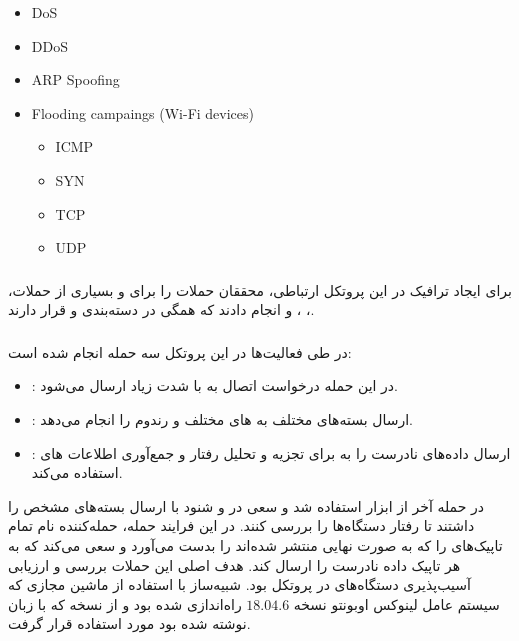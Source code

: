 \begin{LTR}
    \begin{itemize}
        \item DoS
        \item DDoS
        \item ARP Spoofing
        \item Flooding campaings (Wi-Fi devices)
        \begin{itemize}
            \item ICMP
            \item SYN
            \item TCP
            \item UDP
        \end{itemize}
    \end{itemize}
\end{LTR}

\subsubsection{}

برای ایجاد ترافیک در این پروتکل ارتباطی، محققان حملات  را برای
 و بسیاری از حملات، ، ،  و
 انجام دادند که همگی در دسته‌بندی  و  قرار دارند.

\subsubsection{}

در طی فعالیت‌ها در این پروتکل سه حمله انجام شده است:

\begin{itemize}
    \item {}: در این حمله درخواست اتصال به  با
    شدت زیاد ارسال می‌شود.
    \item {}: ارسال بسته‌های مختلف به های مختلف و
    رندوم را انجام می‌دهد.
    \item {}: ارسال داده‌های نادرست را به
     برای تجزیه و تحلیل رفتار و جمع‌آوری اطلاعات های
    استفاده می‌کند.
\end{itemize}

در حمله آخر از ابزار  استفاده شد و سعی در  و شنود
 با ارسال بسته‌های مشخص را داشتند تا رفتار دستگاه‌ها را بررسی کنند.
در این فرایند حمله، حمله‌کننده نام تمام تاپیک‌های  را که به صورت نهایی
منتشر شده‌اند را بدست می‌آورد و سعی می‌کند که به هر تاپیک داده نادرست را ارسال
کند. هدف اصلی این حملات بررسی و ارزیابی آسیب‌پذیری دستگاه‌های  در
پروتکل  بود. شبیه‌ساز با استفاده از ماشین مجازی  که سیستم
عامل لینوکس اوبونتو نسخه $18.04.6$ راه‌اندازی شده بود و از نسخه 
 که با زبان  نوشته شده بود مورد استفاده قرار گرفت.

